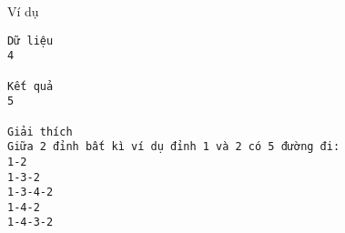 Ví dụ
\begin{verbatim}
Dữ liệu
4

Kết quả
5

Giải thích
Giữa 2 đỉnh bất kì ví dụ đỉnh 1 và 2 có 5 đường đi:
1-2
1-3-2
1-3-4-2
1-4-2
1-4-3-2
\end{verbatim}